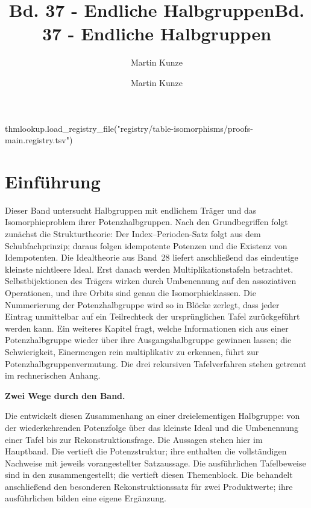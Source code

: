 \documentclass[main.tex]{subfiles}
\title{Bd. 37 - Endliche Halbgruppen}
\author{Martin Kunze}
\date{}
\begin{document}
\title{Bd. 37 - Endliche Halbgruppen}
\author{Martin Kunze}
\date{}
\hypersetup{pageanchor=false}
\maketitle
\hypersetup{pageanchor=true}
\setcounter{tocdepth}{3}
\tableofcontents
\setcounter{file}{37}
\renewcommand{\FormulaBandID}{37}

\begin{luacode*}
  thmlookup.load_registry_file("registry/table-isomorphisms/proofs-main.registry.tsv")
\end{luacode*}

\chapter{Einführung}
\hypertarget{finite-semigroups.main}{}

Dieser Band untersucht Halbgruppen mit endlichem Träger und das
Isomorphieproblem ihrer Potenzhalbgruppen.  Nach den Grundbegriffen folgt
zunächst die Strukturtheorie: Der Index--Perioden-Satz folgt aus dem
Schubfachprinzip; daraus folgen idempotente
Potenzen und die Existenz von Idempotenten.  Die Idealtheorie aus Band~28
liefert anschließend das eindeutige kleinste nichtleere Ideal.  Erst danach
werden Multiplikationstafeln betrachtet.  Selbstbijektionen des Trägers
wirken durch Umbenennung auf den assoziativen Operationen, und ihre Orbits
sind genau die Isomorphieklassen.  Die Nummerierung der Potenzhalbgruppe wird
so in Blöcke zerlegt, dass jeder Eintrag unmittelbar auf ein Teilrechteck
der ursprünglichen Tafel zurückgeführt werden kann.  Ein weiteres Kapitel
fragt, welche Informationen sich aus einer Potenzhalbgruppe wieder über
ihre Ausgangshalbgruppe gewinnen lassen; die Schwierigkeit, Einermengen rein
multiplikativ zu erkennen, führt zur Potenzhalbgruppenvermutung.  Die drei
rekursiven Tafelverfahren stehen getrennt im rechnerischen Anhang.

\par\medskip\noindent\textbf{Zwei Wege durch den Band.}\par
Die \FiniteSemigroupsReadingLink{} entwickelt diesen Zusammenhang an einer
dreielementigen Halbgruppe: von der wiederkehrenden Potenzfolge über das
kleinste Ideal und die Umbenennung einer Tafel bis zur Rekonstruktionsfrage.
Die Aussagen stehen hier im Hauptband. Die \IndexPeriodReadingLink{}
vertieft die Potenzstruktur; ihre \IndexPeriodProofsLink{} enthalten
die vollständigen Nachweise mit jeweils vorangestellter Satzaussage.
Die ausführlichen Tafelbeweise
sind in den \TableIsomorphismsProofsLink{} zusammengestellt; die
\TableIsomorphismsReadingLink{} vertieft diesen Themenblock.
Die \NullproductsReadingLink{} behandelt anschließend den besonderen
Rekonstruktionssatz für zwei Produktwerte; ihre ausführlichen
\NullproductsProofsLink{} bilden eine eigene Ergänzung.
\end{document}
